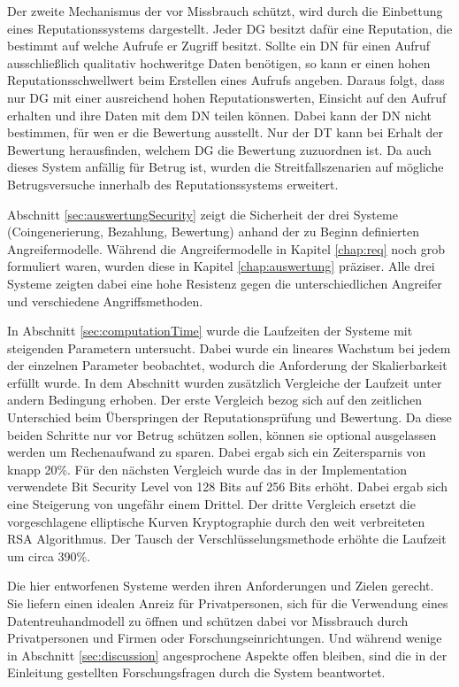 \documentclass[
	fontsize=11pt,
	headings=small,
	parskip=half,           %
	bibliography=totoc,
	numbers=noenddot,       %
	open=any,               %
]{scrreprt}
\begin{document}
Der zweite Mechanismus der vor Missbrauch schützt, wird durch die Einbettung eines Reputationssystems dargestellt. Jeder DG besitzt dafür eine Reputation, die bestimmt auf welche Aufrufe er Zugriff besitzt. Sollte ein DN für einen Aufruf ausschließlich qualitativ hochweritge Daten benötigen, so kann er einen hohen Reputationsschwellwert beim Erstellen eines Aufrufs angeben. Daraus folgt, dass nur DG mit einer ausreichend hohen Reputationswerten, Einsicht auf den Aufruf erhalten und ihre Daten mit dem DN teilen können. Dabei kann der DN nicht bestimmen, für wen er die Bewertung ausstellt. Nur der DT kann bei Erhalt der Bewertung herausfinden, welchem DG die Bewertung zuzuordnen ist. Da auch dieses System anfällig für Betrug ist, wurden die Streitfallszenarien auf mögliche Betrugsversuche innerhalb des Reputationssystems erweitert. 

Abschnitt \ref{sec:auswertungSecurity} zeigt die Sicherheit der drei Systeme (Coingenerierung, Bezahlung, Bewertung) anhand der zu Beginn definierten Angreifermodelle. Während die Angreifermodelle in Kapitel \ref{chap:req} noch grob formuliert waren, wurden diese in Kapitel \ref{chap:auswertung} präziser. Alle drei Systeme zeigten dabei eine hohe Resistenz gegen die unterschiedlichen Angreifer und verschiedene Angriffsmethoden.

In Abschnitt \ref{sec:computationTime} wurde die Laufzeiten der Systeme mit steigenden Parametern untersucht. Dabei wurde ein lineares Wachstum bei jedem der einzelnen Parameter beobachtet, wodurch die Anforderung der Skalierbarkeit erfüllt wurde. In dem Abschnitt wurden zusätzlich Vergleiche der Laufzeit unter andern Bedingung erhoben. Der erste Vergleich bezog sich auf den zeitlichen Unterschied beim Überspringen der Reputationsprüfung und Bewertung. Da diese beiden Schritte nur vor Betrug schützen sollen, können sie optional ausgelassen werden um Rechenaufwand zu sparen. Dabei ergab sich ein Zeitersparnis von knapp 20\%. Für den nächsten Vergleich wurde das in der Implementation verwendete Bit Security Level von 128 Bits auf 256 Bits erhöht. Dabei ergab sich eine Steigerung von ungefähr einem Drittel. Der dritte Vergleich ersetzt die vorgeschlagene elliptische Kurven Kryptographie durch den weit verbreiteten RSA Algorithmus. Der Tausch der Verschlüsselungsmethode erhöhte die Laufzeit um circa 390\%.

Die hier entworfenen Systeme werden ihren Anforderungen und Zielen gerecht. Sie liefern einen idealen Anreiz für Privatpersonen, sich für die Verwendung eines Datentreuhandmodell zu öffnen und schützen dabei vor Missbrauch durch Privatpersonen und Firmen oder Forschungseinrichtungen. Und während wenige in Abschnitt \ref{sec:discussion} angesprochene Aspekte offen bleiben, sind die in der Einleitung gestellten Forschungsfragen durch die System beantwortet.
\end{document}
